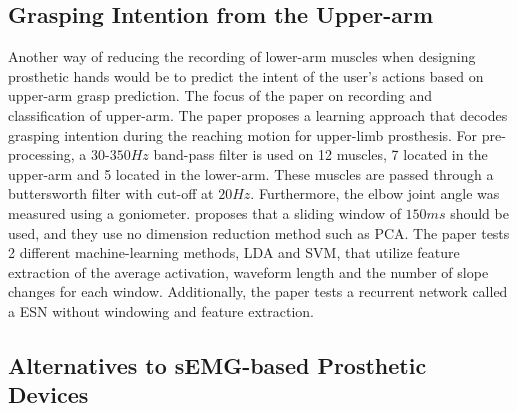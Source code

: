 \documentclass[../main.tex]{subfiles}
\begin{document}
\subsection{Grasping Intention from the Upper-arm}

Another way of reducing the recording of lower-arm muscles when designing prosthetic hands would be to predict the intent of the user's actions based on upper-arm grasp prediction.
The focus of the paper \cite{Batzianoulis2018} on recording and classification of upper-arm.
The paper proposes a learning approach that decodes grasping intention during the reaching motion for upper-limb prosthesis.
For pre-processing, a $30$-$350Hz$ band-pass filter is used on 12 muscles, 7 located in the upper-arm and 5 located in the lower-arm.
These muscles are passed through a buttersworth filter with cut-off at $20Hz$.
Furthermore, the elbow joint angle was measured using a \gls{goniometer}.
\cite{Batzianoulis2018} proposes that a sliding window of $150ms$ should be used, and they use no dimension reduction method such as \gls{PCA}.
The paper tests 2 different machine-learning methods, \gls{LDA} and \gls{SVM}, that utilize feature extraction of the average activation, waveform length and the number of slope changes for each window.
Additionally, the paper tests a recurrent network called a \gls{ESN} without windowing and feature extraction.

\subsection{Alternatives to sEMG-based Prosthetic Devices}
\end{document}
